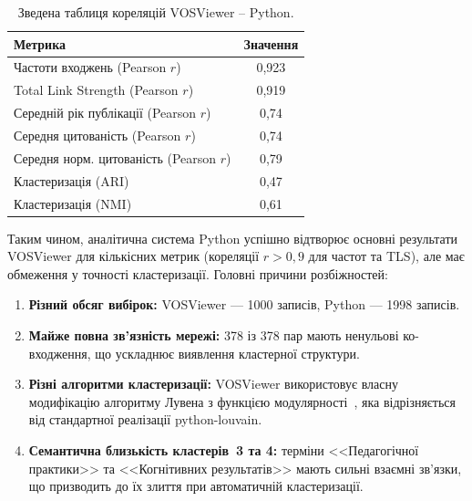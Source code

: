 \begin{table}[htbp]
\centering
\caption{Зведена таблиця кореляцій VOSViewer -- Python.}
\label{tab:correlations}
\begin{tabular}{|l|c|}
\hline
\textbf{Метрика} & \textbf{Значення} \\
\hline
Частоти входжень (Pearson $r$) & 0,923 \\
\hline
Total Link Strength (Pearson $r$) & 0,919 \\
\hline
Середній рік публікації (Pearson $r$) & 0,74 \\
\hline
Середня цитованість (Pearson $r$) & 0,74 \\
\hline
Середня норм. цитованість (Pearson $r$) & 0,79 \\
\hline
Кластеризація (ARI) & 0,47 \\
\hline
Кластеризація (NMI) & 0,61 \\
\hline
\end{tabular}
\end{table}

Таким чином, аналітична система Python успішно відтворює основні результати VOSViewer для кількісних метрик (кореляції $r > 0{,}9$ для частот та TLS), але має обмеження у точності кластеризації. Головні причини розбіжностей:
\begin{enumerate}
    \item \textbf{Різний обсяг вибірок:} VOSViewer --- 1000 записів, Python --- 1998 записів.
    \item \textbf{Майже повна зв'язність мережі:} 378 із 378 пар мають ненульові ко-входження, що ускладнює виявлення кластерної структури.
    \item \textbf{Різні алгоритми кластеризації:} VOSViewer використовує власну модифікацію алгоритму Лувена з функцією модулярності~\cite{Waltman2010}, яка відрізняється від стандартної реалізації python-louvain.
    \item \textbf{Семантична близькість кластерів~3 та 4:} терміни <<Педагогічної практики>> та <<Когнітивних результатів>> мають сильні взаємні зв'язки, що призводить до їх злиття при автоматичній кластеризації.
\end{enumerate}

